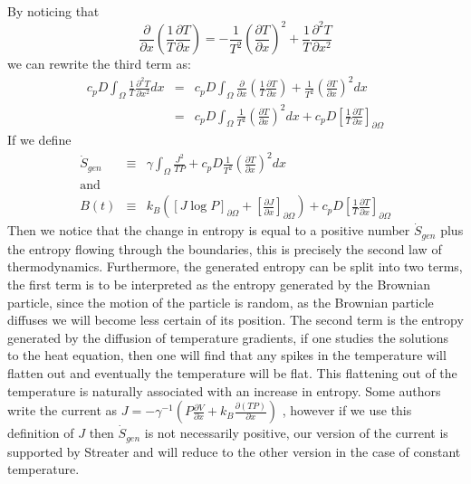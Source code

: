By noticing that
\begin{equation}
\frac{\partial}{\partial x} \left(\frac{1}{T} \frac{\partial T}{\partial x} \right) = -\frac{1}{T^2} \left(\frac{\partial T}{\partial x} \right)^2 + \frac{1}{T} \frac{\partial^2 T}{\partial x^2}
\end{equation}
we can rewrite the third term as:
\begin{eqnarray}
c_p D \int_{\Omega} \frac{1}{T} \frac{\partial^2 T}{\partial x^2} dx &=& c_p D \int_{\Omega} \frac{\partial}{\partial x} \left(\frac{1}{T} \frac{\partial T}{\partial x} \right) + \frac{1}{T^2} \left(\frac{\partial T}{\partial x} \right)^2 dx \\
 &=& c_p D \int_{\Omega} \frac{1}{T^2} \left(\frac{\partial T}{\partial x} \right)^2 dx + c_p D\left[\frac{1}{T} \frac{\partial T}{\partial x} \right]_{\partial \Omega}
\end{eqnarray}
If we define
\begin{eqnarray}
\dot{S}_{gen} &\equiv& \gamma \int_{\Omega} \frac{J^2}{T P} + c_p D \frac{1}{T^2} \left(\frac{\partial T}{\partial x} \right)^2 dx \\
\text{and} \nonumber \\
B(t) &\equiv& k_B \left( [J \log P]_{\partial \Omega} + \left[\frac{\partial J}{\partial x}\right]_{\partial \Omega} \right) + c_p D\left[\frac{1}{T} \frac{\partial T}{\partial x} \right]_{\partial \Omega}
\end{eqnarray}
Then we notice that the change in entropy is equal to a positive number $\dot{S}_{gen}$ plus the entropy flowing through the boundaries, this is precisely the second law of thermodynamics. Furthermore, the generated entropy can be split into two terms, the first term is to be interpreted as the entropy generated by the Brownian particle, since the motion of the particle is random, as the Brownian particle diffuses we will become less certain of its position. The second term is the entropy generated by the diffusion of temperature gradients, if one studies the solutions to the heat equation, then one will find that any spikes in the temperature will flatten out and eventually the temperature will be flat. This flattening out of the temperature is naturally associated with an increase in entropy. Some authors write the current as $J = - \gamma^{-1} (P \frac{\partial V}{\partial x} + k_B \frac{\partial (T P)}{\partial x})$ \cite{Gardiner2009,Kramers1940}, however if we use this definition of $J$ then $\dot{S}_{gen}$ is not necessarily positive, our version of the current is supported by Streater \cite{Streater1997, Streater1997a,Streater2000,Streater1997b} and will reduce to the other version in the case of constant temperature.
